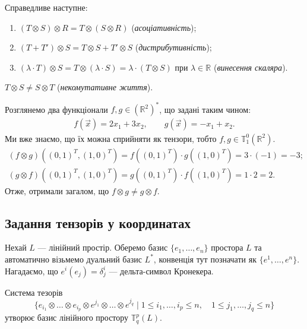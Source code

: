\documentclass{math_library}
\begin{document}
\begin{proposition}
Справедливе наступне:
\begin{enumerate}[nosep,wide=0pt,label={\arabic*)}]
\item $(T \otimes S) \otimes R = T \otimes (S \otimes R)$ (\textit{асоціативність});
\item $(T + T') \otimes S = T \otimes S + T' \otimes S$ (\textit{дистрибутивність});
\item $(\lambda \cdot T) \otimes S = T \otimes (\lambda \cdot S) = \lambda \cdot (T \otimes S)$ при $\lambda \in \mathbb{R}$ (\textit{винесення скаляра}).
\end{enumerate}
\end{proposition}

\begin{remark}
$T \otimes S \neq S \otimes T$ (\textit{некомутативне життя}).
\end{remark}

\begin{example}
Розглянемо два функціонали $f,g \in (\mathbb{R}^2)^*$, що задані таким чином:
\begin{align*}
f(\vec{x}) = 2x_1 + 3x_2, \qquad g(\vec{x}) = -x_1 + x_2.
\end{align*}
Ми вже знаємо, що їх можна сприйняти як тензори, тобто $f,g \in \mathbb{T}_1^0(\mathbb{R}^2)$.
\begin{align*}
(f \otimes g)( (0,1)^T, (1,0)^T) = f((0,1)^T) \cdot g( (1,0)^T) = 3 \cdot (-1) = -3; \\
(g \otimes f)( (0,1)^T, (1,0)^T) = g((0,1)^T) \cdot f((1,0)^T) = 1 \cdot 2 = 2.
\end{align*}
Отже, отримали загалом, що $f \otimes g \neq g \otimes f$.
\end{example}

\subsection{Задання тензорів у координатах}
Нехай $L$ --- лінійний простір. Оберемо базис $\{e_1,\dots,e_n\}$ простора $L$ та автоматично візьмемо дуальний базис $L^*$, конвенція тут позначати як $\{e^1,\dots,e^n\}$. Нагадаємо, що $e^i(e_j) = \delta_{j}^i$ --- дельта-символ Кронекера.

\begin{theorem}
Система тезорів 
\[
\{ e_{i_1} \otimes \dots \otimes e_{i_p} \otimes e^{j_1} \otimes \dots \otimes e^{j_q} \mid 1 \leq i_1,\dots,i_p \leq n, \quad 1 \leq j_1,\dots,j_q \leq n \}
\]
утворює базис лінійного простору $\mathbb{T}_q^p(L)$.
\end{theorem}
\end{document}
